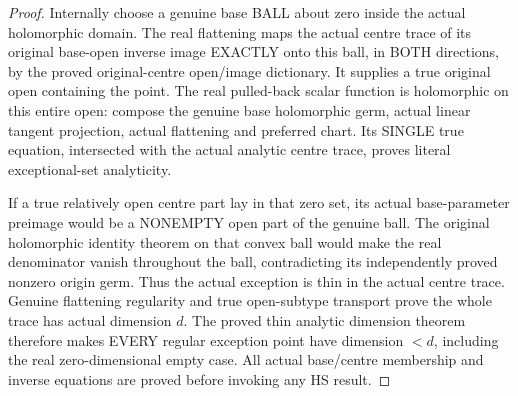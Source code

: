 \begin{proof}
Internally choose a genuine base BALL about zero inside the actual
holomorphic domain. The real flattening maps the actual centre trace of
its original base-open inverse image EXACTLY onto this ball, in BOTH
directions, by the proved original-centre open/image dictionary. It supplies
a true original open containing the point. The real pulled-back scalar
function is holomorphic on this entire open: compose the genuine base
holomorphic germ, actual linear tangent projection, actual flattening and
preferred chart. Its SINGLE true equation, intersected with the actual
analytic centre trace, proves literal exceptional-set analyticity.

If a true relatively open centre part lay in that zero set, its actual
base-parameter preimage would be a NONEMPTY open part of the genuine ball.
The original holomorphic identity theorem on that convex ball would make
the real denominator vanish throughout the ball, contradicting its
independently proved nonzero origin germ. Thus the actual exception is
thin in the actual centre trace. Genuine flattening regularity and true
open-subtype transport prove the whole trace has actual dimension $d$.
The proved thin analytic dimension theorem therefore makes EVERY regular
exception point have dimension $<d$, including the real zero-dimensional
empty case. All actual base/centre membership and inverse equations are
proved before invoking any HS result.
\end{proof}

